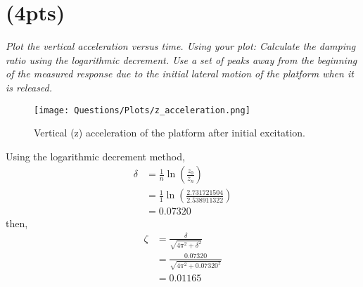 \section{(4pts)}
\textit{Plot the vertical acceleration versus time. Using your plot:
Calculate the damping ratio using the logarithmic decrement. Use a set of peaks 
away from the beginning of the measured response due to the initial lateral motion of the 
platform when it is released.}

\begin{figure}[h]
    \centering
    \texttt{[image: Questions/Plots/z\_acceleration.png]}
    \caption{Vertical (z) acceleration of the platform after initial excitation.}
    \label{fig:z_acceleration}
\end{figure}    

Using the logarithmic decrement method,
\begin{align*}
    \delta &= \frac{1}{n} \ln\left(\frac{z_0}{z_n}\right) \\
    &= \frac{1}{1} \ln\left(\frac{2.731721504}{2.538911322}\right) \\
    &= 0.07320
\end{align*}
then,
\begin{align*}
    \zeta &= \frac{\delta}{\sqrt{4\pi^2 + \delta^2}} \\
    &= \frac{0.07320}{\sqrt{4\pi^2 + 0.07320^2}} \\
    &= \boxed{0.01165}
\end{align*}




